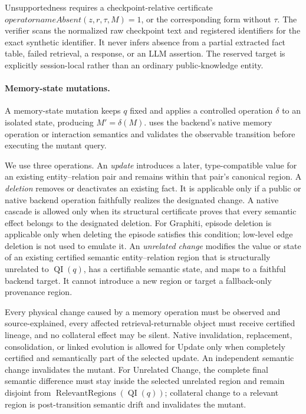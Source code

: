 Unsupportedness requires a checkpoint-relative certificate
\(operatorname{Absent}(z,r,\tau,M)=1\), or the corresponding form without
\(\tau\). The verifier scans the normalized raw checkpoint text and registered
identifiers for the exact synthetic identifier. It never infers absence from
a partial extracted fact table, failed retrieval, a response, or an LLM
assertion. The reserved target is explicitly session-local rather than an
ordinary public-knowledge entity.

\paragraph{Memory-state mutations.}
A memory-state mutation keeps \(q\) fixed and applies a controlled operation
\(\delta\) to an isolated state, producing \(M'=\delta(M)\). \system uses the
backend's native memory operation or interaction semantics and validates the
observable transition before executing the mutant query.

We use three operations. An \emph{update} introduces a later, type-compatible
value for an existing entity--relation pair and remains within that pair's
canonical region. A \emph{deletion} removes or deactivates an existing fact.
It is applicable only if a public or native backend operation faithfully
realizes the designated change. A native cascade is allowed only when its
structural certificate proves that every semantic effect belongs to the
designated deletion.
For Graphiti, episode deletion is applicable only when deleting the episode
satisfies this condition; low-level edge deletion is not used to emulate it.
An \emph{unrelated change} modifies the value or state of an existing
certified semantic entity--relation region that is structurally unrelated to
\(\operatorname{QI}(q)\), has a certifiable semantic state, and maps to a
faithful backend target. It cannot introduce a new region or target a
fallback-only provenance region.

Every physical change caused by a memory operation must be observed and
source-explained, every affected retrieval-returnable object must receive
certified lineage, and no collateral effect may be silent. Native invalidation,
replacement, consolidation, or linked evolution is allowed for Update only
when completely certified and semantically part of the selected update. An
independent semantic change invalidates the mutant. For Unrelated Change, the
complete final semantic difference must stay inside the selected unrelated
region and remain disjoint from
\(\operatorname{RelevantRegions}(\operatorname{QI}(q))\); collateral change
to a relevant region is post-transition semantic drift and invalidates the
mutant.

